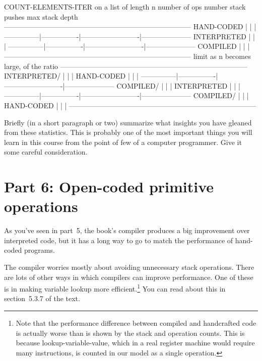 \beginlisp
                            COUNT-ELEMENTS-ITER on a list of length n
\null
                  number of ops      number stack pushes      max stack depth
--------------------------------------------------------------------------------
HAND-CODED     |                |                         |
---------------|----------------|-------------------------|---------------------
INTERPRETED    |                |                         |
---------------|----------------|-------------------------|---------------------
COMPILED       |                |                         |
--------------------------------------------------------------------------------
                       limit as n becomes large, of the ratio
--------------------------------------------------------------------------------
INTERPRETED/   |                |                         |
HAND-CODED     |                |                         |
---------------|----------------|-------------------------|---------------------
COMPILED/      |                |                         |
INTERPRETED    |                |                         |
---------------|----------------|-------------------------|---------------------
COMPILED/      |                |                         |
HAND-CODED     |                |                         |
--------------------------------------------------------------------------------
\endlisp

Briefly (in a short paragraph or two) summarize what insights you have gleaned
from these statistics.  This is probably one of the most important things you
will learn in this course from the point of few of a computer programmer.  Give
it some careful consideration.

\newpage

\section{Part 6: Open-coded primitive operations}

As you've seen in part~5, the book's compiler produces a big
improvement over interpreted code, but it has a long way to go to
match the performance of hand-coded programs.

The compiler worries mostly about avoiding unnecessary stack
operations.  There are lots of other ways in which compilers can
improve performance.  One of these is in making variable lookup more
efficient.\footnote{Note that the performance difference between
compiled and handcrafted code is actually worse than is shown by the
stack and operation counts. This is because {\cf lookup-variable-value}, which
in a real register machine would require many instructions, is counted
in our model as a single operation.} You can read about this in section~5.3.7
of the text.

